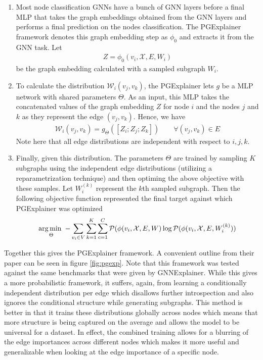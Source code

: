 \begin{enumerate}
	\item Most node classification GNNs have a bunch of GNN layers before a final MLP that takes the graph embeddings obtained from the GNN layers and performs a final prediction on the nodes classification. The PGExplainer framework denotes this graph embedding step as $\phi_0$ and extracts it from the GNN task. Let
	\begin{align*}
		Z = \phi_0(v_i, \mathcal{X}, E, W_i)
	\end{align*}
	be the graph embedding calculated with a sampled subgraph $W_i$.
	\item To calculate the distribution $\mathcal{W}_i(v_j, v_k)$, the PGExplainer lets $g$ be a MLP network with shared parameters $\Theta$. As an input, this MLP takes the concatenated values of the graph embedding $Z$ for node $i$ and the nodes $j$ and $k$ as they represent the edge $(v_j, v_k)$. Hence, we have
	\begin{align*}
		\mathcal{W}_i(v_j, v_k) = g_{\Theta}([Z_i; Z_j; Z_k]) \quad\quad \forall (v_j, v_k) \in E
	\end{align*}
	Note here that all edge distributions are independent with respect to $i, j, k$. 
	\item Finally, given this distribution. The parameters $\Theta$ are trained by sampling $K$ subgraphs using the independent edge distributions (utilizing a reparametrization technique) and then optiming the above objective with these samples. Let $W_i^{(k)}$ represent the $k$th sampled subgraph. Then the following objective function represented the final target against which PGExplainer was optimized
	\begin{align*}
		\operatorname*{arg\,min\,\,}_{\Theta} -\sum_{v_i \in V} \sum_{k = 1}^K \sum_{c = 1}^C \mathcal{P}(\phi(v_i, \mathcal{X}, E, W) \log \mathcal{P}(\phi(v_i, \mathcal{X}, E, W_i^{(k)}))
	\end{align*}
\end{enumerate}
Together this gives the PGExplainer framework. A convenient outline from their paper can be seen in figure \ref{fig:pgexp}. Note that this framework was tested against the same benchmarks that were given by GNNExplainer. While this gives a more probabilistic framework, it suffers, again, from learning a conditionally independent distribution per edge which disallows further introspection and also ignores the conditional structure while generating subgraphs. This method is better in that it trains these distributions globally across nodes which means that more structure is being captured on the average and allows the model to be universal for a dataset. In effect, the combined training allows for a blurring of the edge importances across different nodes which makes it more useful and generalizable when looking at the edge importance of a specific node.

